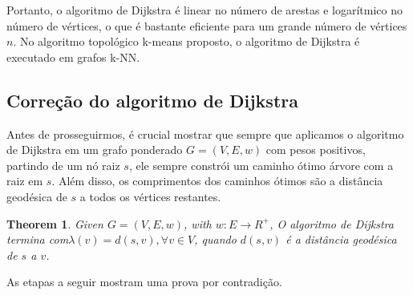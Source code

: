 \documentclass[sn-mathphys,Numbered]{sn-jnl}%
\theoremstyle{thmstyleone}%
\newtheorem{theorem}{Theorem}%
\theoremstyle{thmstyletwo}%
\theoremstyle{thmstylethree}%
\begin{document}
Portanto, o algoritmo de Dijkstra é linear no número de arestas e logarítmico no número de vértices, o que é bastante eficiente para um grande número de vértices $n$. No algoritmo topológico k-means proposto, o algoritmo de Dijkstra é executado em grafos k-NN.

\subsection{Correção do algoritmo de Dijkstra}

Antes de prosseguirmos, é crucial mostrar que sempre que aplicamos o algoritmo de Dijkstra em um grafo ponderado $G = (V, E, w)$ com pesos positivos, partindo de um nó raiz $s$, ele sempre constrói um caminho ótimo árvore com a raiz em $s$. Além disso, os comprimentos dos caminhos ótimos são a distância geodésica de $s$ a todos os vértices restantes.

\vspace{0.5cm}
\begin{theorem}
Given $G = (V, E, w)$, with $w: E \rightarrow R^{+}$, O algoritmo de Dijkstra termina com$\lambda(v) = d(s, v), \forall v \in V$, quando $d(s, v)$ é a distância geodésica de $s$ a $v$.
\end{theorem}
\vspace{0.5cm}

As etapas a seguir mostram uma prova por contradição.
\end{document}
